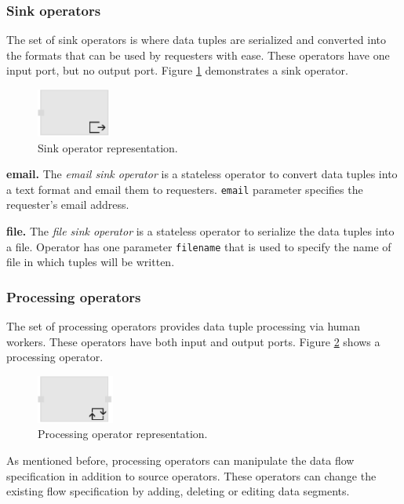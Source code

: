 \subsubsection{Sink operators}
The set of sink operators is where data tuples are serialized and converted into 
the formats that can be used by requesters with ease. These operators have one 
input port, but no output port. Figure \ref{fig:sink operator} demonstrates a sink operator.

\begin{figure}[ht]
	\centering
	\includegraphics[height=60px]{figures/SinkOperator.pdf}
	\caption{Sink operator representation.}
	\label{fig:sink operator}
\end{figure}

\textbf{email.}
The \textit{email sink operator} is a stateless operator to convert data tuples into a 
text format and email them to requesters. \texttt{email} parameter specifies the 
requester's email address. 

\textbf{file.}
The \textit{file sink operator} is a stateless operator to serialize the data tuples into 
a file. Operator has one parameter \texttt{filename} that is used to specify the name 
of file in which tuples will be written.

\subsubsection{Processing operators}
The set of processing operators provides data tuple processing via human workers. 
These operators have both input and output ports. Figure \ref{fig:processing operator} 
shows a processing operator.

\begin{figure}[ht]
	\centering
	\includegraphics[height=60px]{figures/ProcessingOperator.pdf}
	\caption{Processing operator representation.}
	\label{fig:processing operator}
\end{figure}

As mentioned before, processing operators can manipulate the data flow specification 
in addition to source operators. These operators can change the existing flow specification 
by adding, deleting or editing data segments.

